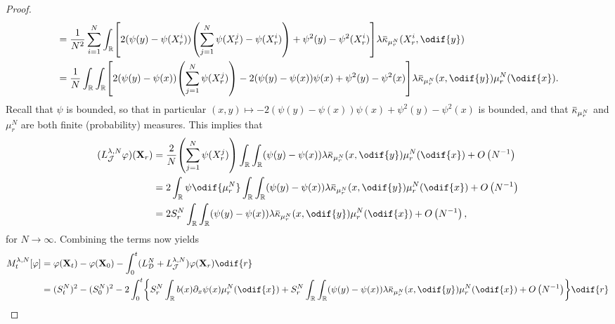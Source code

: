 \begin{proof}
\begin{equation}
\begin{split}
       & = \frac{1}{N^2} \sum_{i=1}^N \int_\potspace \sbr*{ 2 (\psi(y) - \psi(X_r^i)) \br*{\sum_{j=1}^N \psi(X_r^j) - \psi(X_r^i)} + \psi^2(y) - \psi^2(X_r^i) } \lambda \ol{\kappa}_{\mu_r^N}(X_r^i, \odif{y})                               \\
       & = \frac{1}{N} \int_\potspace \int_\potspace \sbr*{ 2 (\psi(y) - \psi(x)) \br*{\sum_{j=1}^N \psi(X_r^j)} - 2 (\psi(y) - \psi(x)) \psi(x) + \psi^2(y) - \psi^2(x) } \lambda \ol{\kappa}_{\mu_r^N}(x, \odif{y}) \mu_r^N(\odif{x}).
    \end{split}
  \end{equation}
  Recall that \( \psi \) is bounded, so that in particular \( (x,y) \mapsto - 2 (\psi(y) - \psi(x)) \psi(x) + \psi^2(y) - \psi^2(x) \) is bounded, and that \( \ol{\kappa}_{\mu_r^N} \) and \( \mu_r^N \) are both finite (probability) measures.
  This implies that
  \begin{equation}
    \begin{split}
      (L_{\cJ}^{\lambda, N} \varphi) (\bm{X}_r)
       & = \frac{2}{N} \br*{\sum_{j=1}^N \psi(X_r^j)}  \int_\potspace \int_\potspace (\psi(y) - \psi(x)) \lambda \ol{\kappa}_{\mu_r^N}(x, \odif{y}) \mu_r^N(\odif{x}) + \bigO{N^{-1}} \\
       & = 2 \int_\potspace \psi \odif{\mu_r^N} \int_\potspace \int_\potspace (\psi(y) - \psi(x)) \lambda \ol{\kappa}_{\mu_r^N}(x, \odif{y}) \mu_r^N(\odif{x})  + \bigO{N^{-1}}       \\
       & = 2 S_r^N \int_\potspace \int_\potspace (\psi(y) - \psi(x)) \lambda \ol{\kappa}_{\mu_r^N}(x, \odif{y}) \mu_r^N(\odif{x})  + \bigO{N^{-1}},
    \end{split}
  \end{equation}
  for \( N \to \infty \).
  Combining the terms now yields
  \begin{equation}
    \begin{split}
      M_t^{\lambda, N}[\varphi]
                                         & = \varphi(\bm{X}_t) - \varphi(\bm{X}_0) - \int_0^t (L_{\cD}^{N} + L_{\cJ}^{\lambda, N}) \varphi (\bm{X}_r) \odif{r}                                                                                                                                             \\
                                         & = (S_t^N)^2 - (S_0^N)^2 - 2 \int_0^t \cbr*{ S_r^N \int_\potspace b(x) \partial_x \psi (x) \mu_r^N(\odif{x}) + S_r^N \int_\potspace \int_\potspace (\psi(y) - \psi(x)) \lambda \ol{\kappa}_{\mu_r^N}(x, \odif{y}) \mu_r^N(\odif{x})  + \bigO{N^{-1}} }  \odif{r} \\

\end{split}
\end{equation}
\end{proof}
